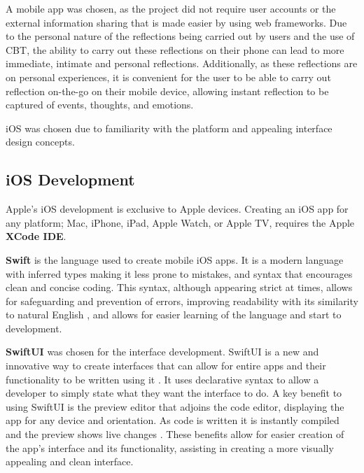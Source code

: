 \documentclass{l4proj}
\begin{document}
A mobile app was chosen, as the project did not require user accounts or the external information sharing that is made easier by using web frameworks. Due to the personal nature of the reflections being carried out by users and the use of CBT, the ability to carry out these reflections on their phone can lead to more immediate, intimate and personal reflections. Additionally, as these reflections are on personal experiences, it is convenient for the user to be able to carry out reflection on-the-go on their mobile device, allowing instant reflection to be captured of events, thoughts, and emotions. 

iOS was chosen due to familiarity with the platform and appealing interface design concepts.

\subsection{iOS Development}

Apple's iOS development is exclusive to Apple devices. Creating an iOS app for any platform; Mac, iPhone, iPad, Apple Watch, or Apple TV, requires the Apple \textbf{XCode IDE}. 

\textbf{Swift} is the language used to create mobile iOS apps. It is a modern language with inferred types making it less prone to mistakes, and syntax that encourages clean and concise coding. This syntax, although appearing strict at times, allows for safeguarding and prevention of errors, improving readability with its similarity to natural English \citep{altexsoft_swift_2021}, and allows for easier learning of the language and start to development.

\textbf{SwiftUI} was chosen for the interface development. SwiftUI is a new and innovative way to create interfaces that can allow for entire apps and their functionality to be written using it \citep{apple_developer_xcode_2021}. It uses declarative syntax to allow a developer to simply state what they want the interface to do. A key benefit to using SwiftUI is the preview editor that adjoins the code editor, displaying the app for any device and orientation. As code is written it is instantly compiled and the preview shows live changes \citep{apple_swiftui_2021}. These benefits allow for easier creation of the app's interface and its functionality, assisting in creating a more visually appealing and clean interface.


\end{document}
